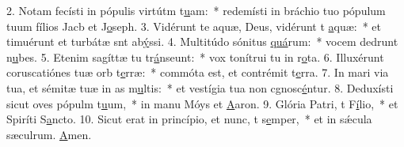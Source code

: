 2. Notam fecísti in pópulis virtútm t\uline{u}am:~* redemísti in bráchio tuo pópulum tuum fílios Jacb et J\uline{o}seph.
3. Vidérunt te aquæ, Deus, vidérunt t \uline{a}quæ:~* et timuérunt et turbátæ snt ab\uline{ý}ssi.
4. Multitúdo sónitus \uline{quá}rum:~* vocem dedrunt n\uline{u}bes.
5. Etenim sagíttæ tu tr\uline{á}nseunt:~* vox tonítrui tu in r\uline{o}ta.
6. Illuxérunt coruscatiónes tuæ orb t\uline{e}rræ:~* commóta est, et contrémit t\uline{e}rra.
7. In mari via tua, et sémitæ tuæ in as m\uline{u}ltis:~* et vestígia tua non cgnosc\uline{é}ntur.
8. Deduxísti sicut oves pópulm t\uline{u}um,~* in manu Móys et \uline{A}aron.
9. Glória Patri, t F\uline{í}lio,~* et Spiríti S\uline{a}ncto.
10. Sicut erat in princípio, et nunc, t s\uline{e}mper,~* et in sǽcula sæculrum. \uline{A}men.
